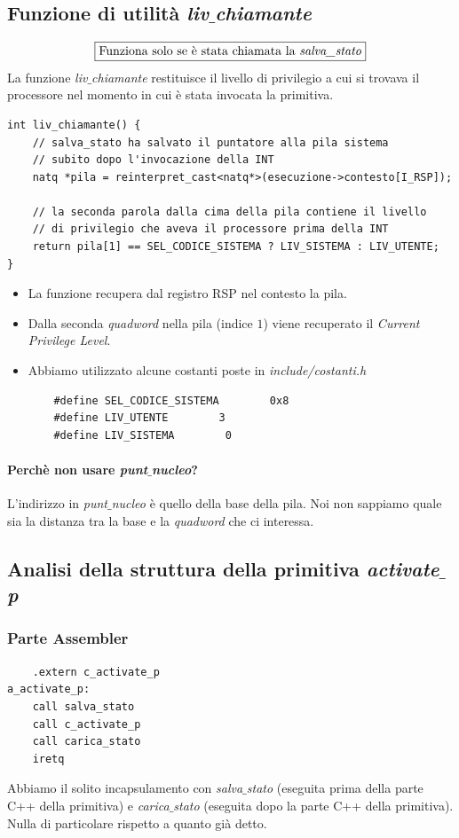 \documentclass[11pt]{report}
\theoremstyle{definition}
\begin{document}
\subsection{Funzione di utilità \emph{liv$\_$chiamante}}
\[\boxed{\text{Funziona solo se è stata chiamata la \emph{salva$\_$stato}}}\]
La funzione \emph{liv$\_$chiamante} restituisce il livello di privilegio a cui si trovava il processore nel momento in cui è stata invocata la primitiva.
\small 
\begin{verbatim}
int liv_chiamante() {
    // salva_stato ha salvato il puntatore alla pila sistema
    // subito dopo l'invocazione della INT
    natq *pila = reinterpret_cast<natq*>(esecuzione->contesto[I_RSP]);
    
    // la seconda parola dalla cima della pila contiene il livello
    // di privilegio che aveva il processore prima della INT
    return pila[1] == SEL_CODICE_SISTEMA ? LIV_SISTEMA : LIV_UTENTE;
}
\end{verbatim}
\normalsize
\begin{itemize}
	\item La funzione recupera dal registro RSP nel contesto la pila.
	\item Dalla seconda \emph{quadword} nella pila (indice $1$) viene recuperato il \emph{Current Privilege Level}.
	\item Abbiamo utilizzato alcune costanti poste in \emph{include/costanti.h}
	\begin{verbatim}
	#define SEL_CODICE_SISTEMA        0x8
	#define LIV_UTENTE        3
	#define LIV_SISTEMA        0
	\end{verbatim}
\end{itemize}
\paragraph{Perchè non usare \emph{punt$\_$nucleo}?} L'indirizzo in \emph{punt$\_$nucleo} è quello della base della pila. Noi non sappiamo quale sia la distanza tra la base e la \emph{quadword} che ci interessa.
\subsection{Analisi della struttura della primitiva \emph{activate$\_$p}}
\subsubsection{Parte Assembler}
\small 
\begin{verbatim}
    .extern c_activate_p
a_activate_p:
    call salva_stato
    call c_activate_p
    call carica_stato
    iretq
\end{verbatim}
\normalsize 
Abbiamo il solito incapsulamento con \emph{salva$\_$stato} (eseguita prima della parte C++ della primitiva) e \emph{carica$\_$stato} (eseguita dopo la parte C++ della primitiva). Nulla di particolare rispetto a quanto già detto.
\end{document}
